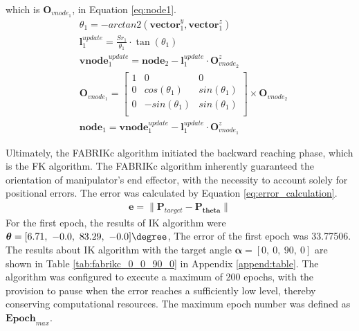 \begin{itemize}
    which is $\textbf{O}_{vnode_1}$, in Equation \ref{eq:node1}.
    \vspace{-5mm}
    \begin{align}
        &\theta_1 = -arctan2(\textbf{vector}_{1}^{y},\textbf{vector}_{1}^{z})
        \label{eq:theta_1} \\
        &\textbf{l}_{1}^{update} = \frac{Sr_1}{\theta_1}\cdot \tan(\theta_1)
        \label{eq:virtual_length_1} \\
        &\textbf{vnode}_{1}^{update} = \textbf{node}_{2} - \textbf{l}_{1}^{update} \cdot \textbf{O}_{vnode_2}^{z}
        \label{eq:vnode1_update} \\
        &\textbf{O}_{vnode_1} =     
        \begin{bmatrix}
            1 & 0 & 0 \\
            0 & cos(\theta_1) & sin(\theta_1) \\
            0 & -sin(\theta_1) & sin(\theta_1) \\
        \end{bmatrix}  
        \times \textbf{O}_{vnode_2}
        \label{eq:orientation_vnode1} \\
        &\textbf{node}_1 = \textbf{vnode}_{1}^{update} - \textbf{l}_{1}^{update} \cdot \textbf{O}_{vnode_1}^{z}
        \label{eq:node1} 
    \end{align}
    \vspace{-15mm}
\end{itemize}
Ultimately, the FABRIKc algorithm initiated the backward reaching phase, which is the FK algorithm. The 
FABRIKc algorithm inherently guaranteed the orientation of manipulator's end effector,  with the necessity to account 
solely for positional errors. The error was calculated by Equation \ref{eq:error_calculation}.
\vspace{-5mm}
\begin{align}
    \textbf{e} = \lVert\textbf{P}_{target} - \textbf{P}_{\boldsymbol{theta}}\rVert
    \label{eq:error_calculation}
\end{align}
For the first epoch, the results of IK algorithm were
$\boldsymbol{\theta} = [6.71,\ -0.0,\ 83.29,\ -0.0]\degree $, 
The error of the first epoch was 33.77506. The results about IK algorithm with the target angle 
$\boldsymbol{\alpha} = [0,\ 0,\ 90,\ 0] $ are shown in Table \ref{tab:fabrikc_0_0_90_0} 
in Appendix \ref{append:table}. The algorithm was configured to execute a maximum of 200 epochs, with 
the provision to pause when the error reaches a sufficiently low level, thereby conserving computational resources. 
The maximum epoch number was defined as ${\textbf{Epoch}}_{max}$.

